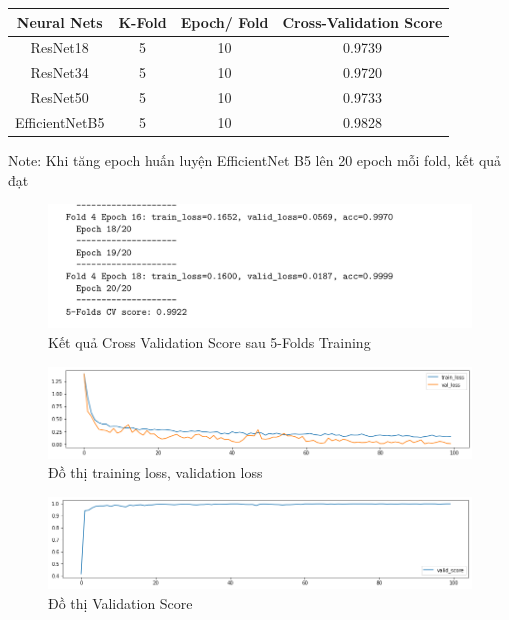 \documentclass{article}
\begin{document}
	\begin{center}
		\begin{tabular}{ |c|c|c|c| } 
			\hline
			Neural Nets & K-Fold & Epoch/ Fold & Cross-Validation Score \\ \hline
			ResNet18 & 5 & 10 & 0.9739 \\ 
			ResNet34 & 5 & 10 & 0.9720 \\ 
			ResNet50 & 5 & 10 & 0.9733 \\ 
			EfficientNetB5 & 5 & 10 & 0.9828 \\ 
			\hline
		\end{tabular}
	\end{center}
	Note: Khi tăng epoch huấn luyện EfficientNet B5 lên 20 epoch mỗi fold, kết quả đạt
	\begin{figure}[H]
		\centering
		\includegraphics[width=1\linewidth]{results/efficientnet-b5/CV_Score_5_Folds_EfficientNetB5.png}
		\caption{Kết quả Cross Validation Score sau 5-Folds Training}
		\label{fig:writing-thesis}
	\end{figure}
	\begin{figure}[H]
		\centering
		\includegraphics[width=1\linewidth]{results/efficientnet-b5/training_loss_results.png}
		\caption{Đồ thị training loss, validation loss}
		\label{fig:writing-thesis}
	\end{figure}
	\begin{figure}[H]
		\centering
		\includegraphics[width=1\linewidth]{results/efficientnet-b5/valid_score_results.png}
		\caption{Đồ thị Validation Score}
		\label{fig:writing-thesis}
	\end{figure}
\end{document}
